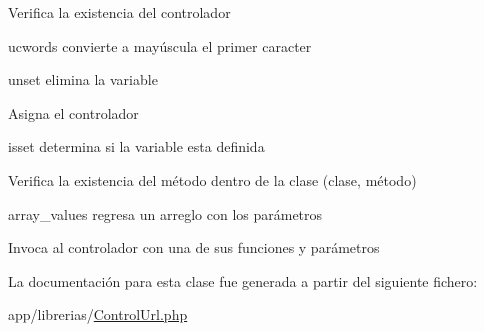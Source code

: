 Verifica la existencia del controlador

ucwords convierte a mayúscula el primer caracter

unset elimina la variable

Asigna el controlador

isset determina si la variable esta definida

Verifica la existencia del método dentro de la clase (clase, método)

array\+\_\+values regresa un arreglo con los parámetros

Invoca al controlador con una de sus funciones y parámetros 

La documentación para esta clase fue generada a partir del siguiente fichero\+:\begin{DoxyCompactItemize}
\item 
app/librerias/\hyperlink{ControlUrl_8php}{Control\+Url.\+php}\end{DoxyCompactItemize}
